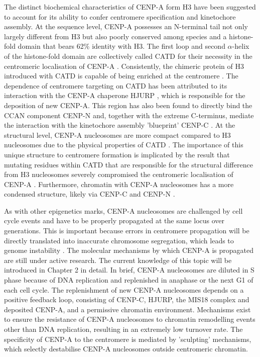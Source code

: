 The distinct biochemical characteristics of CENP-A form H3 have been suggested to account for its ability to confer centromere specification and kinetochore assembly. At the sequence level, CENP-A possesses an N-terminal tail not only largely different from H3 \citep{Sullivan1994HumanCentromere.} but also poorly conserved among species \citep{Goutte-Gattat2013PhosphorylationFunction} and a histone-fold domain that bears 62\% identity with H3. The first loop and second $\alpha$-helix of the histone-fold domain are collectively called CATD for their necessity in the centromeric localisation of CENP-A \citep{Black2007}. Consistently, the chimeric protein of H3 introduced with CATD is capable of being enriched at the centromere \citep{Black2007a}. The dependence of centromere targeting on CATD has been attributed to its interaction with the CENP-A chaperone HJURP \citep{Zhou2011StructuralScm3, Bassett2012, Hu2011StructureHJURP, Shuaib2010HJURPCentromeres}, which is responsible for the deposition of new CENP-A. This region has also been found to directly bind the CCAN component CENP-N \citep{Logsdon2015, Carroll2010, Carroll2009} and, together with the extreme C-terminus, mediate the interaction with the kinetochore assembly 'blueprint' CENP-C \citep{Carroll2010, Kato2013Spt6H3, Guse2011, Walstein2021}. At the structural level, CENP-A nucleosomes are more compact compared to H3 nucleosomes due to the physical properties of CATD \citep{Black2004, Sekulic2010}. The importance of this unique structure to centromere formation is implicated by the result that mutating residues within CATD that are responsible for the structural difference from H3 nucleosomes severely compromised the centromeric localisation of CENP-A \citep{Sekulic2010}. Furthermore, chromatin with CENP-A nucleosomes has a more condensed structure, likely via CENP-C and CENP-N \citep{Panchenko2011, Geiss2014, Zhou2022}. 

As with other epigenetics marks, CENP-A nucleosomes are challenged by cell cycle events and have to be properly propagated at the same locus over generations. This is important because errors in centromere propagation will be directly translated into inaccurate chromosome segregation, which leads to genome instability \citep{McClintock1939TheMeiosis, Koshland1987ACerevisiae}. The molecular mechanisms by which CENP-A is propagated are still under active research. The current knowledge of this topic will be introduced in Chapter 2 in detail. In brief, CENP-A nucleosomes are diluted in S phase because of DNA replication and replenished in anaphase or the next G1 of each cell cycle. The replenishment of new CENP-A nucleosomes depends on a positive feedback loop, consisting of CENP-C, HJURP, the MIS18 complex and deposited CENP-A, and a permissive chromatin environment. Mechanisms exist to ensure the resistance of CENP-A nucleosomes to chromatin remodelling events other than DNA replication, resulting in an extremely low turnover rate. The specificity of CENP-A to the centromere is mediated by 'sculpting' mechanisms, which selectly destabilise CENP-A nucleosomes outside centromeric chromatin. 

